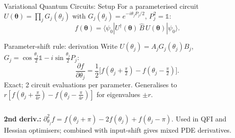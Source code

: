 \documentclass[aspectratio=169,11pt]{beamer}
\newcommand{\btheta}{\boldsymbol{\theta}}
\newcommand{\id}{\mathbb{1}}
\begin{document}
\begin{frame}{Variational Quantum Circuits: Setup}
  For a parameterised circuit
  $U(\btheta) = \prod_j G_j(\theta_j)$ with
  $G_j(\theta_j) = e^{-i\theta_j P_j/2}$, $P_j^2=\id$:
  \[
    f(\btheta)
    = \langle\psi_0|U^\dagger(\btheta)\,\hat{B}\,
      U(\btheta)|\psi_0\rangle.
  \]

  \begin{block}{Parameter-shift rule: derivation}
    Write $U(\theta_j)=A_j G_j(\theta_j)B_j$,
    $G_j=\cos\tfrac{\theta_j}{2}\id-i\sin\tfrac{\theta_j}{2}P_j$:
    \[
      \frac{\partial f}{\partial\theta_j}
      = \frac{1}{2}\bigl[f(\theta_j+\tfrac{\pi}{2})
                        -f(\theta_j-\tfrac{\pi}{2})\bigr].
    \]
    Exact; 2 circuit evaluations per parameter.
    Generalises to $r[f(\theta_j+\frac\pi{4r})-f(\theta_j-\frac\pi{4r})]$
    for eigenvalues $\pm r$.
  \end{block}
  \vspace{-2pt}
  \begin{columns}[T]
    \textbf{2nd deriv.:}
    $\partial^2_{\theta_j}f
      = f(\theta_j{+}\pi) - 2f(\theta_j) + f(\theta_j{-}\pi)$.
    Used in QFI and Hessian optimisers;
    combined with input-shift gives mixed PDE derivatives.
  \end{columns}
\end{frame}
\end{document}
